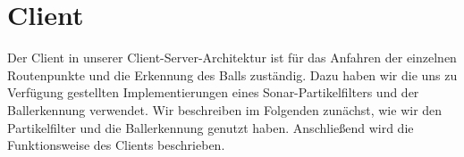 \section{Client}
\label{sec:client}
Der Client in unserer Client-Server-Architektur ist für das Anfahren der
einzelnen Routenpunkte und die Erkennung des Balls zuständig. Dazu haben
wir die uns zu Verfügung gestellten Implementierungen
eines Sonar-Partikelfilters und der Ballerkennung verwendet. Wir beschreiben
im Folgenden zunächst, wie wir den Partikelfilter und die
Ballerkennung genutzt haben. Anschließend wird die Funktionsweise des
Clients beschrieben.









